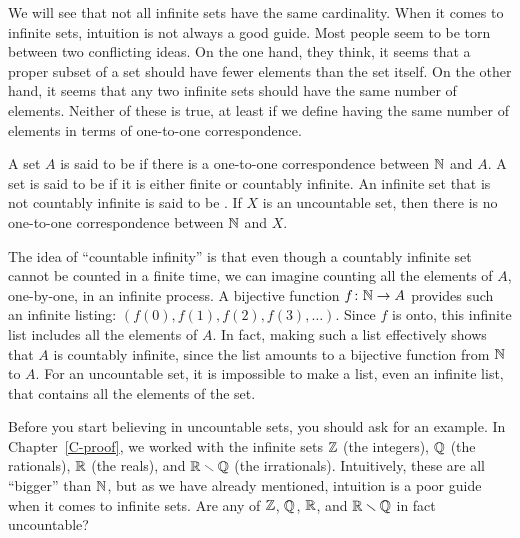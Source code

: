We will see that not all infinite sets have the same cardinality.  When it
comes to infinite sets, intuition is not always a good guide.  Most people
seem to be torn between two conflicting ideas.  On the one hand, they think, it seems
that a proper subset of a set should have fewer elements than the set itself.
On the other hand, it seems that any two infinite sets should have the same
number of elements.  Neither of these is true, at least if we define
having the same number of elements in terms of one-to-one correspondence.

A set $A$ is said to be  if there is a one-to-one
correspondence between ${\mathbb N}$ and $A$.  A set is said to be
 if it is either finite or countably infinite.
An infinite set that is not countably infinite is said to be
.  If $X$ is an uncountable set, then there
is no one-to-one correspondence between ${\mathbb N}$ and $X$.  

The idea of ``countable infinity''
is that even though a countably infinite set cannot be counted
in a finite time, we can imagine counting all the elements of $A$,
one-by-one, in an infinite process.  A bijective function
$f\colon{\mathbb N}\to A$ provides such an infinite listing:
$(f(0),f(1),f(2),f(3),\dots)$.  Since $f$ is onto, this infinite list
includes all the elements of $A$.  In fact, making such a list effectively
shows that $A$ is countably infinite, since the list amounts to a bijective
function from ${\mathbb N}$ to $A$.  For an uncountable set, it is
impossible to make a list, even an infinite list, that contains all the
elements of the set.

Before you start believing in uncountable sets, you should ask for
an example.  In Chapter~\ref{C-proof}, we worked with the infinite
sets ${\mathbb Z}$ (the integers), ${\mathbb Q}$ (the rationals), ${\mathbb R}$ (the reals), and
${\mathbb R}\smallsetminus{\mathbb Q}$ (the irrationals).  Intuitively, these are all ``bigger''
than ${\mathbb N}$, but as we have already mentioned, intuition is a poor guide
when it comes to infinite sets.  Are any of ${\mathbb Z}$, ${\mathbb Q}$, ${\mathbb R}$, and ${\mathbb R}\smallsetminus{\mathbb Q}$
in fact uncountable?


